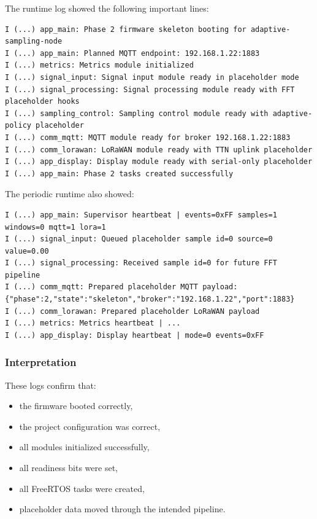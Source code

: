 \documentclass[12pt,a4paper]{article}
\begin{document}
The runtime log showed the following important lines:

\begin{lstlisting}
I (...) app_main: Phase 2 firmware skeleton booting for adaptive-sampling-node
I (...) app_main: Planned MQTT endpoint: 192.168.1.22:1883
I (...) metrics: Metrics module initialized
I (...) signal_input: Signal input module ready in placeholder mode
I (...) signal_processing: Signal processing module ready with FFT placeholder hooks
I (...) sampling_control: Sampling control module ready with adaptive-policy placeholder
I (...) comm_mqtt: MQTT module ready for broker 192.168.1.22:1883
I (...) comm_lorawan: LoRaWAN module ready with TTN uplink placeholder
I (...) app_display: Display module ready with serial-only placeholder
I (...) app_main: Phase 2 tasks created successfully
\end{lstlisting}

The periodic runtime also showed:

\begin{lstlisting}
I (...) app_main: Supervisor heartbeat | events=0xFF samples=1 windows=0 mqtt=1 lora=1
I (...) signal_input: Queued placeholder sample id=0 source=0 value=0.00
I (...) signal_processing: Received sample id=0 for future FFT pipeline
I (...) comm_mqtt: Prepared placeholder MQTT payload: {"phase":2,"state":"skeleton","broker":"192.168.1.22","port":1883}
I (...) comm_lorawan: Prepared placeholder LoRaWAN payload
I (...) metrics: Metrics heartbeat | ...
I (...) app_display: Display heartbeat | mode=0 events=0xFF
\end{lstlisting}

\subsubsection*{Interpretation}

These logs confirm that:

\begin{itemize}
    \item the firmware booted correctly,
    \item the project configuration was correct,
    \item all modules initialized successfully,
    \item all readiness bits were set,
    \item all FreeRTOS tasks were created,
    \item placeholder data moved through the intended pipeline.
\end{itemize}
\end{document}
